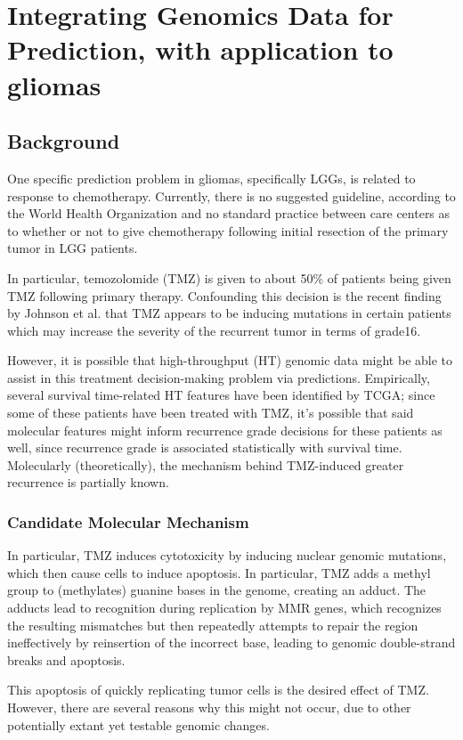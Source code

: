 \chapter{Integrating Genomics Data for Prediction, with application to gliomas}

\section{Background}

One specific prediction problem in gliomas, specifically LGGs, is related to response to chemotherapy. Currently, there is no suggested guideline, according to the World Health Organization and no standard practice between care centers as to whether or not to give chemotherapy following initial resection of the primary tumor in LGG patients.

In particular, temozolomide (TMZ) is given to about 50\% of patients being given TMZ following 
primary therapy. Confounding this decision is the recent finding by Johnson et al. that TMZ appears to be inducing mutations in certain patients which may increase the severity of the recurrent tumor in terms of grade16. 

However, it is possible that high-throughput (HT) genomic data might be able to assist in this treatment decision-making problem via predictions. Empirically, several survival time-related HT features have been identified by TCGA; since some of these patients have been treated with TMZ, it’s possible that said molecular features might inform recurrence grade decisions for these patients as well, since recurrence grade is associated statistically with survival time. 
Molecularly (theoretically), the mechanism behind TMZ-induced greater recurrence is partially known.

\subsection{Candidate Molecular Mechanism}
In particular, TMZ induces cytotoxicity by inducing nuclear genomic mutations, which then cause cells to induce apoptosis. In particular, TMZ adds a methyl group to (methylates) guanine bases in the genome, creating an adduct. The adducts lead to recognition during replication by MMR genes, which recognizes the resulting mismatches but then repeatedly attempts to repair the region ineffectively by reinsertion of the incorrect base, leading to genomic double-strand breaks and apoptosis. 

This apoptosis of quickly replicating tumor cells is the desired effect of TMZ. However, there are several reasons why this might not occur, due to other potentially extant yet testable genomic changes.

